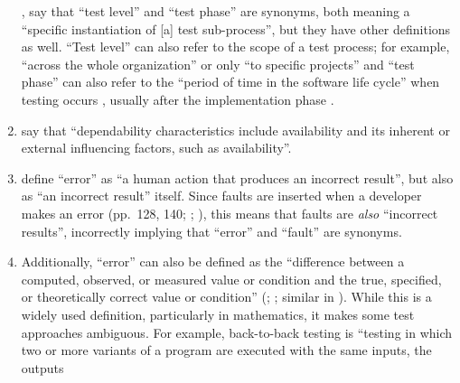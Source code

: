 \begin{enumerate}
              \cite[pp.~469, 470]{IEEE2017}, \cite[p.~9]{IEEE2013} \fi say that
          ``test level'' and ``test phase'' are synonyms, both meaning a
          ``specific instantiation of [a] test sub-process'', but they have
          other definitions as well. ``Test level'' can also
          refer to the scope of a test process; for example, ``across the whole
          organization'' or only ``to specific projects''
          \citeyearpar[p.~24]{IEEE2022} and ``test phase'' can also refer to
          the ``period of time in the software life cycle'' when testing occurs
          \citeyearpar[p.~470]{IEEE2017}, usually after the implementation phase
          \citep[pp.~420, 509;][p.~56]{Perry2006}.
    \item %
          \citet[p.~375]{IEEE2017} say that ``dependability characteristics
          include availability and its inherent or external influencing
          factors, such as availability''.
    \item %
          \citet[p.~128]{IEEE2010} define
          ``error'' as ``a human action that produces an incorrect result'',
          but also as ``an incorrect result'' itself. Since faults are inserted
          when a developer makes an error %
          (pp.~128, 140; \citealp[p.~12\=/3]{SWEBOK2025};
          \citealp[pp.~399\==400]{vanVliet2000}), this means that faults are
          \emph{also} ``incorrect results'', incorrectly implying that
          ``error'' and ``fault'' are synonyms.
    \item %
          Additionally, ``error'' can also be defined as the
          ``difference between a computed, observed, or measured value or
          condition and the true, specified, or theoretically correct value
          or condition'' (\citealp[p.~165]{IEEE2017}; \citeyear[p.~128]{IEEE2010};
          similar in \citealp[pp.~17\=/18 to 17\=/19, 18\=/7 to 18\=/8]{SWEBOK2025}).
          While this is a widely used definition, particularly in mathematics,
          it makes some test approaches ambiguous.
          For example, back-to-back testing is ``testing in which two or more
          variants of a program are executed with the same inputs, the outputs

\end{enumerate}
